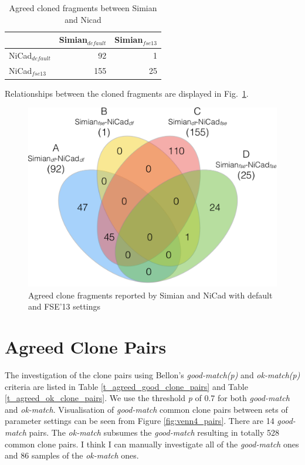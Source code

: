 \documentclass{IEEEtran}
\begin{document}
\begin{table}[h]
	\centering
	\caption{Agreed cloned fragments between Simian and Nicad}
	\label{t_agreed_clone}
	\begin{tabular}{l|r|r}
		\hline
		& Simian$_{\mathrm{\textit{default}}}$ & Simian$_{\mathrm{\textit{fse13}}}$ \\ %
		\hline
		NiCad$_{\mathrm{\textit{default}}}$ & 92          & 1        \\%
		NiCad$_{\mathrm{\textit{fse13}}}$   & 155         & 25           \\ %
		\hline
	\end{tabular}
\end{table}

Relationships between the cloned fragments are displayed in Fig.~\ref{fig:venn4}.

\begin{figure}[H]
\centering
\includegraphics[width=0.5\linewidth]{venn4}
\caption[Agreed clone fragments reported by Simian and NiCad with default and FSE'13 settings]{Agreed clone fragments reported by Simian and NiCad with default and FSE'13 settings}
\label{fig:venn4}
\end{figure}

\section*{Agreed Clone Pairs}
The investigation of the clone pairs using Bellon's \textit{good-match(p)} and \textit{ok-match(p)} criteria are listed in  Table \ref{t_agreed_good_clone_pairs} and Table \ref{t_agreed_ok_clone_pairs}. We use the threshold \textit{p} of 0.7 for both \textit{good-match} and \textit{ok-match}. Visualisation of \textit{good-match} common clone pairs between sets of parameter settings can be seen from Figure \ref{fig:venn4_pairs}. There are 14 \textit{good-match} pairs. The \textit{ok-match} subsumes the \textit{good-match} resulting in totally 528 common clone pairs. I think I can manually investigate all of the \textit{good-match} ones and 86 samples of the \textit{ok-match} ones.
\end{document}
